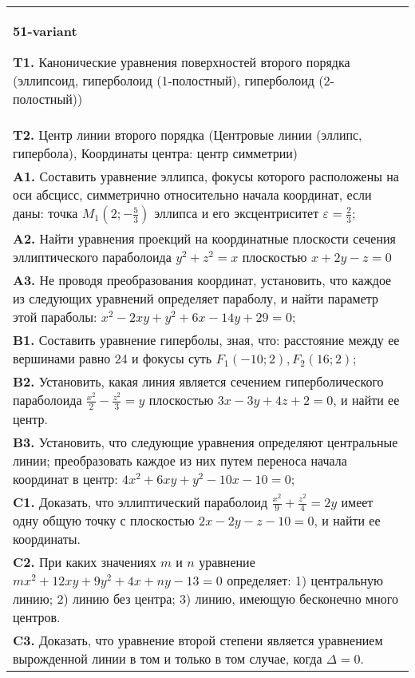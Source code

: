 \documentclass{article}
\begin{document}
\begin{tabular}{m{17cm}}
\textbf{51-variant}
\newline

\textbf{T1.} Канонические уравнения поверхностей второго порядка (эллипсоид, гиперболоид (1-полостный), гиперболоид (2-полостный)) \\
\textbf{T2.} Центр линии второго порядка (Центровые линии (эллипс, гипербола), Координаты центра: центр симметрии) \\
\textbf{A1.} Составить уравнение эллипса, фокусы которого расположены на оси абсцисс, симметрично относительно начала координат, если даны: точка $M_1\left(2 ;-\frac{5}{3}\right)$ эллипса и его эксцентриситет $\varepsilon=\frac{2}{3}$; \\
\textbf{A2.} Найти уравнения проекций на координатные плоскости сечения эллиптического параболоида $y^2+z^2=x$ плоскостью $x+2 y-z=0$ \\
\textbf{A3.} Не проводя преобразования координат, установить, что каждое из следующих уравнений определяет параболу, и найти параметр этой параболы: $x^2-2 x y+y^2+6 x-14 y+29=0$; \\
\textbf{B1.} Составить уравнение гиперболы, зная, что: расстояние между ее вершинами равно 24 и фокусы суть $F_1(-10 ; 2), F_2(16 ; 2)$; \\
\textbf{B2.} Установить, какая линия является сечением гиперболического параболоида $\frac{x^2}{2}-\frac{z^2}{3}=y$ плоскостью $3 x-3 y+4 z+2=0$, и найти ее центр. \\
\textbf{B3.} Установить, что следующие уравнения определяют центральные линии; преобразовать каждое из них путем переноса начала координат в центр: $4 x^2+6 x y+y^2-10 x-10=0$; \\
\textbf{C1.} Доказать, что эллиптический параболоид $\frac{x^2}{9}+\frac{z^2}{4}=2 y$ имеет одну общую точку с плоскостью $2 x-2 y-z-10=0$, и найти ее координаты. \\
\textbf{C2.} При каких значениях $m$ и $n$ уравнение $m x^2+12 x y+9 y^2+4 x+n y-13=0$ определяет: 1) центральную линию; 2) линию без центра; 3) линию, имеющую бесконечно много центров. \\
\textbf{C3.} Доказать, что уравнение второй степени является уравнением вырожденной линии в том и только в том случае, когда $\Delta=0$. \\

\end{tabular}
\vspace{1cm}
\end{document}
